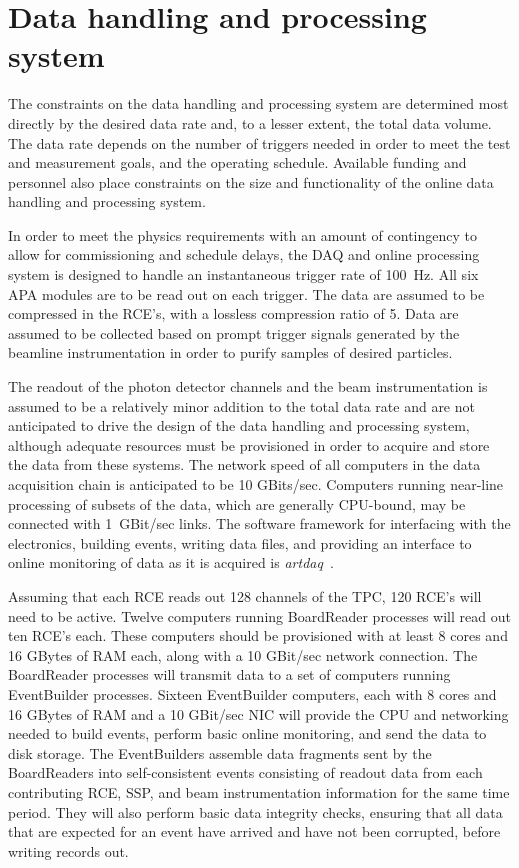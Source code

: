 \section{Data handling and processing system}

The constraints on the data handling and processing system are
determined most directly by the desired data rate and, to a lesser
extent, the total data volume.  The data rate depends on the number of
triggers needed in order to meet the test and measurement goals, and
the operating schedule.  Available funding and personnel also place
constraints on the size and functionality of the online data handling
and processing system.

In order to meet the physics requirements with an amount of
contingency to allow for commissioning and schedule delays, the DAQ
and online processing system is designed to handle an instantaneous
trigger rate of 100~Hz.  All six APA modules are to be read out on
each trigger.  The data are assumed to be compressed in the RCE's,
with a lossless compression ratio of 5.  Data are assumed to be
collected based on prompt trigger signals generated by the beamline
instrumentation in order to purify samples of desired particles.

The readout of the photon detector channels and the beam
instrumentation is assumed to be a relatively minor addition to the
total data rate and are not anticipated to drive the design of the
data handling and processing system, although adequate resources must
be provisioned in order to acquire and store the data from these
systems.  The network speed of all computers in the data acquisition
chain is anticipated to be 10 GBits/sec.  Computers running near-line
processing of subsets of the data, which are generally CPU-bound, may
be connected with 1~GBit/sec links.  The software framework for
interfacing with the electronics, building events, writing data files,
and providing an interface to online monitoring of data as it is
acquired is {\it artdaq}~\cite{artdaq}.

Assuming that each RCE reads out 128 channels of the TPC, 120 RCE's
will need to be active.  Twelve computers running BoardReader
processes will read out ten RCE's each.  These computers should be
provisioned with at least 8 cores and 16 GBytes of RAM each, along
with a 10 GBit/sec network connection.  The BoardReader processes will
transmit data to a set of computers running EventBuilder processes.
Sixteen EventBuilder computers, each with 8 cores and 16 GBytes of RAM
and a 10 GBit/sec NIC will provide the CPU and networking needed to
build events, perform basic online monitoring, and send the data to
disk storage.  The EventBuilders assemble data fragments sent by the
BoardReaders into self-consistent events consisting of readout data
from each contributing RCE, SSP, and beam instrumentation information
for the same time period.  They will also perform basic data integrity
checks, ensuring that all data that are expected for an event have
arrived and have not been corrupted, before writing records out.

